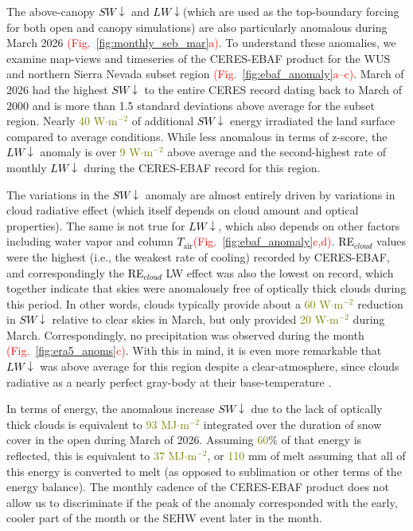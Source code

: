 \documentclass[draft]{agujournal2019}
\newcommand{\fig}[2]{\textcolor{red}{(Fig.~\ref{#1}{#2})}}   %
\newcommand{\mynum}[1]{\textcolor{olive}{#1}}
\newcommand{\tair}{\textcolor{black}{$T_{\mathrm{air}}$}\xspace}
\newcommand{\lwdn}{\textcolor{black}{$LW\downarrow$}\xspace}
\newcommand{\swdn}{\textcolor{black}{$SW\downarrow$}\xspace}
\newcommand{\rfcirrus}{\textcolor{black}{RE$_{cloud}$}\xspace}
\newcommand{\wmsq}{\textcolor{olive}{W$\cdot$m$^{-2}$}\xspace}
\newcommand{\mjmtwo}{\textcolor{olive}{MJ$\cdot$m$^{-2}$}\xspace}
\begin{document}
The above-canopy \swdn and \lwdn (which are used as the top-boundary forcing for both open and canopy simulations) are also particularly anomalous during March 2026 \fig{fig:monthly_seb_mar}{a}.
To understand these anomalies, we examine map-views and timeseries of the CERES-EBAF product for the WUS and northern Sierra Nevada subset region \fig{fig:ebaf_anomaly}{a--c}.
March of 2026 had the highest \swdn to the entire CERES record dating back to March of 2000 and is more than 1.5 standard deviations above average for the subset region.
Nearly \mynum{40} \wmsq of additional \swdn energy irradiated the land surface compared to average conditions.
While less anomalous in terms of z-score, the \lwdn anomaly is over \mynum{9} \wmsq above average and the second-highest rate of monthly \lwdn during the CERES-EBAF record for this region.

The variations in the \swdn anomaly are almost entirely driven by variations in cloud radiative effect (which itself depends on cloud amount and optical properties).
The same is not true for \lwdn, which also depends on other factors including water vapor and column \tair \fig{fig:ebaf_anomaly}{c,d}.
\rfcirrus values were the highest (i.e., the weakest rate of cooling) recorded by CERES-EBAF, and correspondingly the \rfcirrus LW effect was also the lowest on record, which together indicate that skies were anomalously free of optically thick clouds during this period.
In other words, clouds typically provide about a \mynum{60} \wmsq reduction in \swdn relative to clear skies in March, but only provided \mynum{20} \wmsq during March. 
Correspondingly, no precipitation was observed during the month \fig{fig:era5_anoms}{c}.
With this in mind, it is even more remarkable that \lwdn was above average for this region despite a clear-atmosphere, since clouds radiative as a nearly perfect gray-body at their base-temperature \cite{Shupe2004-kl}.


In terms of energy, the anomalous increase \swdn due to the lack of optically thick clouds is equivalent to \mynum{93} \mjmtwo integrated over the duration of snow cover in the open during March of 2026. 
Assuming \mynum{60}\% of that energy is reflected, this is equivalent to \mynum{37} \mjmtwo, or \mynum{110} mm of melt assuming that all of this energy is converted to melt (as opposed to sublimation or other terms of the energy balance).
The monthly cadence of the CERES-EBAF product does not allow us to discriminate if the peak of the anomaly corresponded with the early, cooler part of the month or the SEHW event later in the month.
\end{document}
